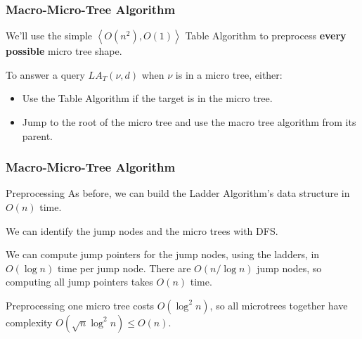 \documentclass[aspectratio=169]{beamer}
\begin{document}
\begin{frame}
\begin{columns}[onlytextwidth]
\begin{column}{.38\textwidth}

  \end{column}%
\end{columns}

\end{frame}

\begin{frame}
\frametitle{Macro-Micro-Tree Algorithm}

We'll use the simple $\left<O(n^2), O(1)\right>$ Table Algorithm to
preprocess \textbf{every possible} micro tree shape.

\pause\vspace{1em}

To answer a query $LA_T(\nu, d)$ when $\nu$ is in a micro tree, either:
\begin{itemize}
\item Use the Table Algorithm if the target is in the micro tree.
\item Jump to the root of the micro tree and use the macro tree algorithm
  from its parent.
\end{itemize}

\end{frame}

\begin{frame}
\frametitle{Macro-Micro-Tree Algorithm}

\begin{block}{Preprocessing}
  As before, we can build the Ladder Algorithm's data structure in $O(n)$
  time.

  \pause\vspace{1em} We can identify the jump nodes and the micro trees
  with DFS.

  We can compute jump pointers for the jump nodes, using the ladders, in
  $O(\log n)$ time per jump node.  There are $O(n/\log n)$ jump nodes, so
  computing all jump pointers takes $O(n)$ time.

  \pause\vspace{1em} Preprocessing one micro tree costs $O(\log^2 n)$, so
  all microtrees together have complexity $O(\sqrt n \log^2 n) \le O(n)$.

\end{block}

\end{frame}
\end{document}

